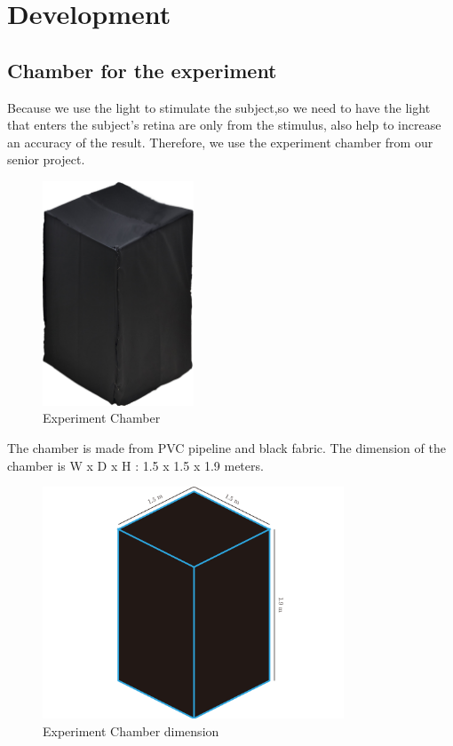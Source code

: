 \chapter{Development}

\label{ch:Development}

\setlength{\parindent}{4em}
\setlength{\parskip}{1em}
\renewcommand{\baselinestretch}{1.5}

\section{Chamber for the experiment}
Because we use the light to stimulate the subject,so we need to have the light that enters the subject's retina are only from the stimulus, also help to increase an accuracy of the result. Therefore, we use the experiment chamber from our senior project.\\
\begin{figure}[ht]
	\centering
	\includegraphics[width=0.4\textwidth]{chapter6/blackbox.jpg}
	\caption{Experiment Chamber}
\end{figure}
The chamber is made from PVC pipeline and black fabric. The dimension of the chamber is W x D x H : 1.5 x 1.5 x 1.9 meters.\\
\begin{figure}[ht]
	\centering
	\includegraphics[width=0.8\textwidth]{chapter6/dark_wire.pdf}
	\caption{Experiment Chamber dimension}
\end{figure}
